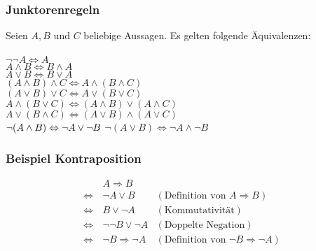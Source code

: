 \subsubsection{Junktorenregeln}
\begin{minipage}{0.9\linewidth}
Seien $A,B$ und $C$ beliebige Aussagen. Es gelten folgende Äquivalenzen: \\
\\
$\neg\neg A\Leftrightarrow A$\\
$A\wedge B\Leftrightarrow B\wedge A$\\
$A\vee B\Leftrightarrow B\vee A$\\
$(A\wedge B)\wedge C\Leftrightarrow A\wedge (B\wedge C)$ \\
$(A\vee B)\vee C\Leftrightarrow A\vee (B\vee C)$\\
$A\wedge (B\vee C)\Leftrightarrow (A\wedge B)\vee (A\wedge C)$ \\
$A\vee (B\wedge C)\Leftrightarrow (A\vee B)\wedge (A\vee C)$\\
$\neg(A\wedge B)\Leftrightarrow\neg A\vee\neg B\\$
$\neg(A\vee B)\Leftrightarrow \neg A\wedge\neg B$\\
\end{minipage}

\subsubsection{Beispiel Kontraposition}
\begin{minipage}{0.9\linewidth}
\begin{align*}
                     &A\Rightarrow B\\
   \Leftrightarrow\, &\neg A\lor B                  &(\text{Definition von }A\Rightarrow B)\\
   \Leftrightarrow\, &B\lor \neg A                  &(\text{Kommutativität})\\
   \Leftrightarrow\, &\neg\neg B\lor\neg A          &(\text{Doppelte Negation})\\
   \Leftrightarrow\, &\neg B\Rightarrow \neg A      &(\text{Definition von }\neg B\Rightarrow\neg A)
\end{align*}
\end{minipage}

